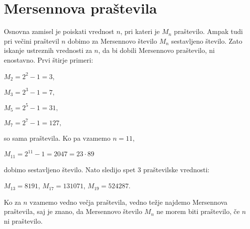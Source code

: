 \documentclass[12pt]{article}
\begin{document}
\section{Mersennova praštevila}
Osnovna zamisel je poiskati vrednost $n$, pri kateri je $M_n$ praštevilo. Ampak tudi pri večini praštevil $n$ dobimo za Mersennovo število $M_n$ sestavljeno število. Zato iskanje ustreznih vrednosti za $n$, da bi dobili Mersennovo praštevilo, ni enostavno.
Prvi štirje primeri: 
\newpage
\begin{center}
$M_2=2^2-1=3$,
\end{center}
\begin{center}
$M_3=2^3-1=7,$
\end{center}
\begin{center}
$M_5=2^5-1=31,$
\end{center}
\begin{center}
$M_7=2^7-1=127,$
\end{center}
so sama praštevila. 
\newline
Ko pa vzamemo $n=11$,

\begin{center}
$M_{11}=2^{11}-1=2047=23\cdot89$
\end{center}
dobimo sestavljeno število. Nato sledijo spet 3 praštevilske vrednosti:
\begin{center}
$M_{13}=8191$, $M_{17}=131071$, $M_{19}=524287.$
\end{center}

Ko za $n$ vzamemo vedno večja praštevila, vedno težje najdemo Mersennova praštevila, saj je znano, da Mersennovo število $M_n$ ne morem biti praštevilo, če $n$ ni praštevilo.
\end{document}
